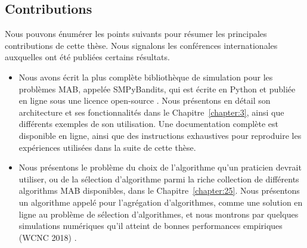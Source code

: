 \begin{resume_fr}
\section*{Contributions}

Nous pouvons énumérer les points suivants pour résumer les principales contributions de cette thèse.
Nous signalons les conférences internationales auxquelles ont été publiées certains résultats.

\begin{itemize}


    \item
    Nous avons écrit la plus complète bibliothèque de simulation pour les problèmes MAB, appelée SMPyBandits, qui est écrite en Python et publiée en ligne sous une licence open-source \cite{SMPyBandits,SMPyBanditsJMLR}.
    Nous présentons en détail son architecture et ses fonctionnalités dans le Chapitre~\ref{chapter:3}, ainsi que différents exemples de son utilisation.
    Une documentation complète est disponible en ligne, ainsi que des instructions exhaustives pour reproduire les expériences utilisées dans la suite de cette thèse.

    \item
    Nous présentons le problème du choix de l'algorithme qu'un praticien devrait utiliser, ou de la sélection d'algorithme parmi la riche collection de différents algorithms MAB disponibles, dans le Chapitre~\ref{chapter:25}.
    Nous présentons un algorithme appelé \Aggr{} pour l'agrégation d'algorithmes, comme une solution en ligne au problème de sélection d'algorithmes, et nous montrons par quelques simulations numériques qu'il atteint de bonnes performances empiriques
    (WCNC 2018) \cite{Besson2018WCNC}.


\end{itemize}
\end{resume_fr}
